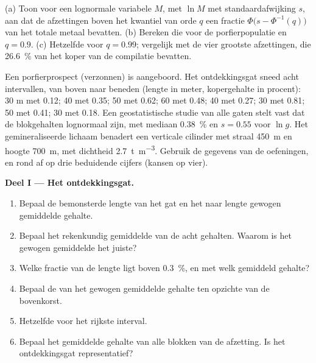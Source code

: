 \begin{exercise}[$\star\star\star$]\label{exo:b2:ore-deposits:12}
(a) Toon voor een lognormale variabele $M$, met $\ln M$ met standaardafwijking $s$, aan dat de afzettingen boven
het kwantiel van orde $q$ een fractie $\Phi\bigl(s - \Phi^{-1}(q)\bigr)$ van het totale metaal bevatten.
(b) Bereken die voor de porfierpopulatie en $q = 0.9$. (c) Hetzelfde voor $q = 0.99$; vergelijk met
de vier grootste afzettingen, die \qty{26.6}{\percent} van het koper van de compilatie bevatten.
\end{exercise}

\begin{problem}\label{pb:b2:ore-deposits:1}
Een porfierprospect (verzonnen) is aangeboord. Het ontdekkingsgat sneed acht intervallen, van boven
naar beneden (lengte in meter, kopergehalte in procent): 30 m met 0.12; 40 met 0.35; 50 met 0.62; 60
met 0.48; 40 met 0.27; 30 met 0.81; 50 met 0.41; 30 met 0.18. Een geostatistische studie van alle gaten
stelt vast dat de blokgehalten lognormaal zijn, met mediaan \qty{0.38}{\percent} en $s = 0.55$ voor
$\ln g$. Het gemineraliseerde lichaam benadert een verticale cilinder met straal \qty{450}{m} en hoogte
\qty{700}{m}, met dichtheid \qty{2.7}{t.m^{-3}}. Gebruik de gegevens van de oefeningen, en rond af op drie
beduidende cijfers (kansen op vier).

\noindent\textbf{Deel I --- Het ontdekkingsgat.}
\begin{enumerate}
  \item Bepaal de bemonsterde lengte van het gat en het naar lengte gewogen gemiddelde gehalte.
  \item Bepaal het rekenkundig gemiddelde van de acht gehalten. Waarom is het gewogen gemiddelde het juiste?
  \item Welke fractie van de lengte ligt boven \qty{0.3}{\percent}, en met welk gemiddeld gehalte?
  \item Bepaal de  van het gewogen gemiddelde gehalte ten opzichte van de bovenkorst.
  \item Hetzelfde voor het rijkste interval.
  \item Bepaal het gemiddelde gehalte van alle blokken van de afzetting. Is het ontdekkingsgat representatief?
\end{enumerate}


\end{problem}
